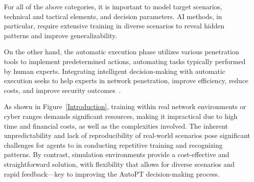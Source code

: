 For all of the above categories, it is important to model target scenarios, technical and tactical elements, and decision parameters. AI methods, in particular, require extensive training in diverse scenarios to reveal hidden patterns and improve generalizability. 

On the other hand, the automatic execution phase utilizes various penetration tools to implement predetermined actions, automating tasks typically performed by human experts. 
Integrating intelligent decision-making with automatic execution seeks to help experts in network penetration, improve efficiency, reduce costs, and improve security outcomes~\cite{chenke2023survey}.



As shown in Figure~\ref{Introduction}, training within real network environments or cyber ranges demands significant resources, making it impractical due to high time and financial costs, as well as the complexities involved.
The inherent unpredictability and lack of reproducibility of real-world scenarios pose significant challenges for agents to in conducting repetitive training and recognizing patterns. By contrast, simulation environments provide a cost-effective and straightforward solution, with flexibility that allows for diverse scenarios and rapid feedback—key to improving the AutoPT decision-making process.


